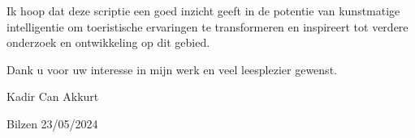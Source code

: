Ik hoop dat deze scriptie een goed inzicht geeft in de potentie van kunstmatige intelligentie om toeristische ervaringen te transformeren en inspireert tot verdere onderzoek en ontwikkeling op dit gebied.

Dank u voor uw interesse in mijn werk en veel leesplezier gewenst.



Kadir Can Akkurt

Bilzen 23/05/2024
\\